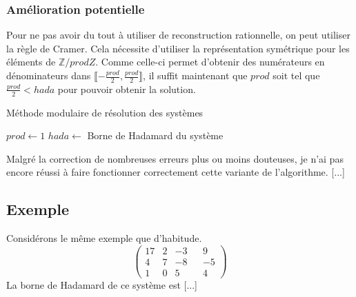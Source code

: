 \documentclass[french]{article}
\begin{document}
\subsubsection{Amélioration potentielle}
Pour ne pas avoir du tout à utiliser de reconstruction rationnelle, on peut utiliser la règle de Cramer. Cela nécessite d'utiliser la représentation symétrique pour les éléments de $\mathbb{Z}/prodZ$. Comme celle-ci permet d'obtenir des numérateurs en dénominateurs dans $\llbracket-\frac{prod}{2},\frac{prod}{2}\rrbracket$, il suffit maintenant que $prod$ soit tel que $\frac{prod}{2} < hada$ pour pouvoir obtenir la solution.
\newline
\begin{algorithm}[H]
	\DontPrintSemicolon
	\caption{Méthode modulaire de résolution des systèmes}
	$prod \gets 1$
	$hada \gets$ Borne de Hadamard du système\\
\end{algorithm}
\leavevmode \newline
Malgré la correction de nombreuses erreurs plus ou moins douteuses, je n'ai pas encore réussi à faire fonctionner correctement cette variante de l'algorithme. [...]
\subsection{Exemple}
Considérons le même exemple que d'habitude.
\begin{equation*}
	\begin{pmatrix}
		17 & 2 & -3 & & 9\\
		4 & 7 & -8 & & -5\\
		1 & 0 & 5 & & 4
	\end{pmatrix}
\end{equation*}
La borne de Hadamard de ce système est [...]
\end{document}
